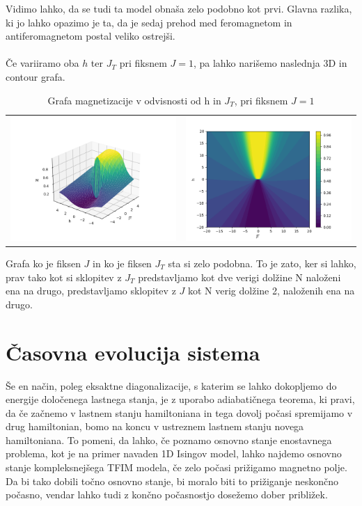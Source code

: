 \documentclass{article}
\begin{document}
\noindent Vidimo lahko, da se tudi ta model obnaša zelo podobno kot prvi. Glavna razlika, ki jo lahko opazimo je ta, da je sedaj prehod med feromagnetom in antiferomagnetom postal veliko ostrejši.\\\\

\noindent Če variiramo oba $h$ ter $J_T$ pri fiksnem $J = 1$, pa lahko narišemo naslednja 3D in contour grafa.

\begin{table}[H]
\begin{tabular}{cc}
     \includegraphics[trim = 100 20 100 0, clip ,width = .4 \linewidth]{2TFIM1.png}
     &  
     \includegraphics[width = .5 \linewidth]{2TFIM2.png}\\
\end{tabular}
\caption*{Grafa magnetizacije v odvisnosti od h in $J_T$, pri fiksnem $J = 1$}
\end{table}


\noindent Grafa ko je fiksen $J$ in ko je fiksen $J_T$ sta si zelo podobna. To je zato, ker si lahko, prav tako kot si sklopitev z $J_T$ predstavljamo kot dve verigi dolžine N naloženi ena na drugo, predstavljamo sklopitev z $J$ kot N verig dolžine 2, naloženih ena na drugo.

\section{Časovna evolucija sistema}
Še en način, poleg eksaktne diagonalizacije, s katerim se lahko dokopljemo do energije določenega lastnega stanja, je z uporabo adiabatičnega teorema, ki pravi, da če začnemo v lastnem stanju hamiltoniana in tega dovolj počasi spremijamo v drug hamiltonian, bomo na koncu v ustreznem lastnem stanju novega hamiltoniana. To pomeni, da lahko, če poznamo osnovno stanje enostavnega problema, kot je na primer navaden 1D Isingov model, lahko najdemo osnovno stanje kompleksnejšega TFIM modela, če zelo počasi prižigamo magnetno polje. Da bi tako dobili točno osnovno stanje, bi moralo biti to prižiganje neskončno počasno, vendar lahko tudi z končno počasnostjo dosežemo dober približek.
\end{document}
